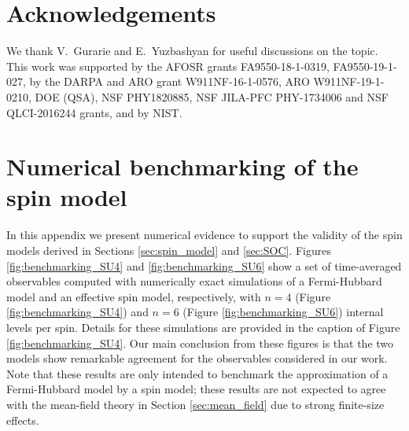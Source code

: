 \documentclass[aps,pra,nofootinbib,twocolumn,superscriptaddress]{revtex4-2}
\newcommand{\1}{\mathds{1}}
\begin{document}
\section*{Acknowledgements}

We thank V.~Gurarie and E.~Yuzbashyan for useful discussions on the topic.
This work was supported by the AFOSR grants FA9550-18-1-0319, FA9550-19-1-027, by the DARPA and ARO grant W911NF-16-1-0576, ARO W911NF-19-1-0210, DOE (QSA), NSF PHY1820885, NSF JILA-PFC PHY-1734006 and NSF QLCI-2016244 grants, and by NIST.


\onecolumngrid
\appendix

\section{Numerical benchmarking of the spin model}
\label{sec:benchmarking}

In this appendix we present numerical evidence to support the validity of the spin models derived in Sections \ref{sec:spin_model} and \ref{sec:SOC}.
Figures \ref{fig:benchmarking_SU4} and \ref{fig:benchmarking_SU6} show a set of time-averaged observables computed with numerically exact simulations of a Fermi-Hubbard model and an effective spin model, respectively, with $n=4$ (Figure \ref{fig:benchmarking_SU4}) and $n=6$ (Figure \ref{fig:benchmarking_SU6}) internal levels per spin.
Details for these simulations are provided in the caption of Figure \ref{fig:benchmarking_SU4}.
Our main conclusion from these figures is that the two models show remarkable agreement for the observables considered in our work.
Note that these results are only intended to benchmark the approximation of a Fermi-Hubbard model by a spin model; these results are not expected to agree with the mean-field theory in Section \ref{sec:mean_field} due to strong finite-size effects.
\end{document}
